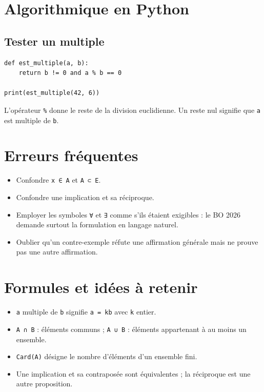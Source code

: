 
\section{Algorithmique en Python}

\subsection{Tester un multiple}

\begin{verbatim}
def est_multiple(a, b):
    return b != 0 and a % b == 0

print(est_multiple(42, 6))
\end{verbatim}

L'opérateur \texttt{\%} donne le reste de la division euclidienne. Un reste nul signifie que \texttt{a} est multiple de \texttt{b}.

\section{Erreurs fréquentes}

\begin{itemize}
\item Confondre \texttt{x ∈ A} et \texttt{A ⊂ E}.
\item Confondre une implication et sa réciproque.
\item Employer les symboles \texttt{∀} et \texttt{∃} comme s'ils étaient exigibles : le BO 2026 demande surtout la formulation en langage naturel.
\item Oublier qu'un contre-exemple réfute une affirmation générale mais ne prouve pas une autre affirmation.
\end{itemize}

\section{Formules et idées à retenir}

\begin{itemize}
\item \texttt{a} multiple de \texttt{b} signifie \texttt{a = kb} avec \texttt{k} entier.
\item \texttt{A ∩ B} : éléments communs ; \texttt{A ∪ B} : éléments appartenant à au moins un ensemble.
\item \texttt{Card(A)} désigne le nombre d'éléments d'un ensemble fini.
\item Une implication et sa contraposée sont équivalentes ; la réciproque est une autre proposition.
\end{itemize}

